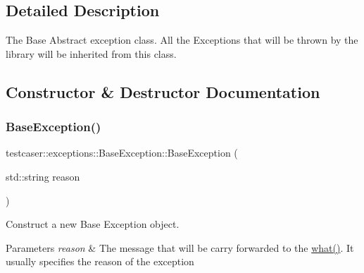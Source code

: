 \subsection{Detailed Description}
The Base Abstract exception class. All the Exceptions that will be thrown by the library will be inherited from this class. 



\subsection{Constructor \& Destructor Documentation}
\mbox{\label{classtestcaser_1_1exceptions_1_1BaseException_a70b5f42e6197e2600f7163f843060af2}} 
\subsubsection{\texorpdfstring{BaseException()}{BaseException()}}
{\footnotesize\ttfamily testcaser\+::exceptions\+::\+Base\+Exception\+::\+Base\+Exception (\begin{DoxyParamCaption}\item[{std\+::string}]{reason }\end{DoxyParamCaption})\hspace{0.3cm}{\ttfamily [inline]}}



Construct a new Base Exception object. 


\begin{DoxyParams}{Parameters}
{\em reason} & The message that will be carry forwarded to the \mbox{\hyperlink{classtestcaser_1_1exceptions_1_1BaseException_a28590a861913f870d9761990853e74b7}{what()}}. It usually specifies the reason of the exception \\
\hline
\end{DoxyParams}
\mbox{\label{classtestcaser_1_1exceptions_1_1BaseException_adf792df62deef0ec4f4c1e34c59179fa}} 
